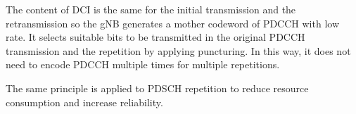 \documentclass[conference,10pt]{IEEEtran}
\begin{document}
The content of DCI is the same for the initial transmission and the retransmission so the gNB generates a mother codeword of PDCCH with low rate. It selects suitable bits to be transmitted in the original PDCCH transmission and the repetition by applying puncturing. In this way, it does not need to encode PDCCH multiple times for multiple repetitions. 

The same principle is applied to PDSCH repetition to reduce resource consumption and increase reliability.

\end{document}
